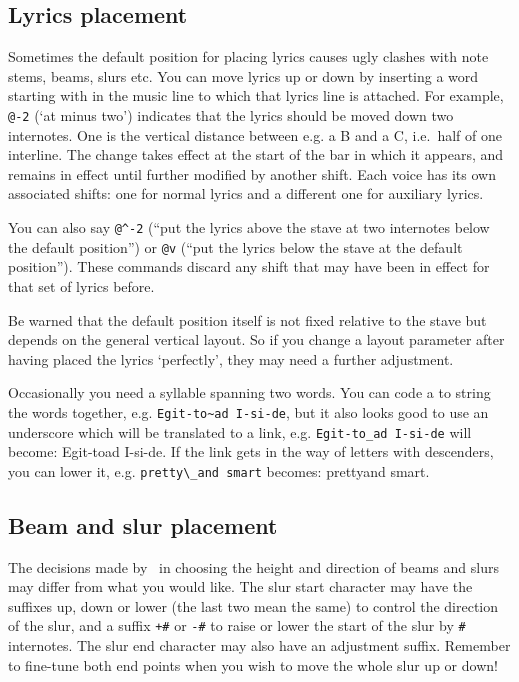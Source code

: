 \documentclass[11pt]{article}
\begin{document}
\subsection{Lyrics placement}  \label{fine-tune-lyrics}

Sometimes the default position for placing lyrics causes ugly clashes 
with note stems, beams, slurs etc.  
You can move lyrics up or down by 
inserting a word starting with \ixem{\atsign} in the music line to which that
lyrics line is attached.   For example, \verb"@-2" (`at minus two') 
indicates that the lyrics should be moved down two internotes.  One 
 is the vertical distance between e.g. a B and a C, i.e.~half 
of one interline.  The change takes effect at the start of the bar 
in which it appears, and remains in effect until further modified 
by another shift.  Each voice has its own associated shifts: one for
normal lyrics and a different one for auxiliary lyrics.  

You can also say \verb'@^-2' (``put the lyrics above the stave at
two internotes below the default position'') or \verb'@v'  (``put the 
lyrics below the stave at the default position'').   These commands 
discard any shift that may have been in effect for that set of lyrics before.

Be warned that the default position itself is not fixed relative to the 
stave but depends on the general vertical layout.  So if you change a 
layout parameter after having placed the lyrics `perfectly', they may 
need a further adjustment. 

Occasionally you need a syllable spanning two words.
You can code a  to string the words together,
e.g.  \verb'Egit-to~ad I-si-de', but it also looks good to use an
underscore which will be translated to a link, 
e.g. \verb'Egit-to_ad I-si-de' will become: Egit-to\lyrlink ad I-si-de.
If the link gets in the way of letters with descenders, you can lower
it,  e.g.  \verb'pretty\_and smart' becomes: pretty\lowlyrlink and smart.

\subsection{Beam and slur placement}  \label{beam&slur}

The decisions made by \PMX\ in choosing the height and direction of 
beams and slurs may differ from what you would like.  The slur start 
character may have the suffixes \mark up, \mark down or \mark lower (the 
last two mean the same) to control the direction of the slur, and a 
suffix \verb"+#" or \verb"-#" to raise or lower the start of the slur by 
\verb"#" internotes.  The slur end character may also have an adjustment 
suffix.  Remember to fine-tune both end points when you wish to move the 
whole slur up or down!  
\end{document}
